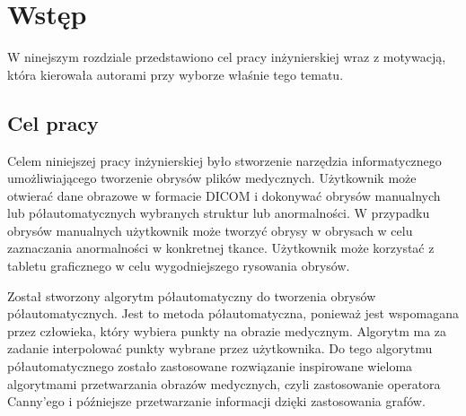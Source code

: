 \documentclass[a4paper,11pt,twoside,openright]{report}
\theoremstyle{definition}
\begin{document}
\thispagestyle{empty}
\newpage

\null\thispagestyle{empty}\newpage


\tableofcontents
\thispagestyle{empty}


\null\thispagestyle{empty}\newpage
\pagestyle{fancy}
\setcounter{page}{11} %

\chapter*{Wstęp}

W ninejszym rozdziale przedstawiono cel pracy inżynierskiej wraz z motywacją, która kierowała autorami przy wyborze właśnie tego tematu.

\section*{Cel pracy}

Celem niniejszej pracy inżynierskiej było stworzenie narzędzia informatycznego umożliwiającego tworzenie obrysów plików medycznych. Użytkownik może otwierać dane obrazowe w formacie DICOM i dokonywać obrysów manualnych lub półautomatycznych wybranych struktur lub anormalności. W przypadku obrysów manualnych użytkownik może tworzyć obrysy w obrysach w celu zaznaczania anormalności w konkretnej tkance. Użytkownik może korzystać z tabletu graficznego w celu wygodniejszego rysowania obrysów.

Został stworzony algorytm półautomatyczny do tworzenia obrysów półautomatycznych. Jest to metoda półautomatyczna, ponieważ jest wspomagana przez człowieka, który wybiera punkty na obrazie medycznym. Algorytm ma za zadanie interpolować punkty wybrane przez użytkownika.  Do tego algorytmu półautomatycznego zostało zastosowane rozwiązanie inspirowane wieloma algorytmami przetwarzania obrazów medycznych, czyli zastosowanie operatora Canny'ego i późniejsze przetwarzanie informacji dzięki zastosowania grafów.
\end{document}
